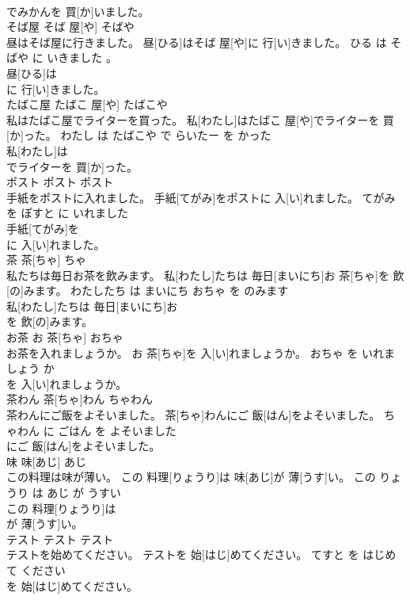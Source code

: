 \documentclass[8pt]{extreport}
\begin{document}
\begin{CJK}{UTF8}{min}
\\	でみかんを 買[か]いました。			
\\	そば屋	そば 屋[や]	そばや	
\\	昼はそば屋に行きました。	昼[ひる]はそば 屋[や]に 行[い]きました。	ひる は そばや に いきました 。	
\\	昼[ひる]は
\\	に 行[い]きました。			
\\	たばこ屋	たばこ 屋[や]	たばこや	
\\	私はたばこ屋でライターを買った。	私[わたし]はたばこ 屋[や]でライターを 買[か]った。	わたし は たばこや で らいたー を かった	
\\	私[わたし]は
\\	でライターを 買[か]った。			
\\	ポスト	ポスト	ポスト	
\\	手紙をポストに入れました。	手紙[てがみ]をポストに 入[い]れました。	てがみ を ぽすと に いれました	
\\	手紙[てがみ]を
\\	に 入[い]れました。			
\\	茶	茶[ちゃ]	ちゃ	
\\	私たちは毎日お茶を飲みます。	私[わたし]たちは 毎日[まいにち]お 茶[ちゃ]を 飲[の]みます。	わたしたち は まいにち おちゃ を のみます	
\\	私[わたし]たちは 毎日[まいにち]お
\\	を 飲[の]みます。			
\\	お茶	お 茶[ちゃ]	おちゃ	
\\	お茶を入れましょうか。	お 茶[ちゃ]を 入[い]れましょうか。	おちゃ を いれましょう か	
\\	を 入[い]れましょうか。			
\\	茶わん	茶[ちゃ]わん	ちゃわん	
\\	茶わんにご飯をよそいました。	茶[ちゃ]わんにご 飯[はん]をよそいました。	ちゃわん に ごはん を よそいました	
\\	にご 飯[はん]をよそいました。			
\\	味	味[あじ]	あじ	
\\	この料理は味が薄い。	この 料理[りょうり]は 味[あじ]が 薄[うす]い。	この りょうり は あじ が うすい	
\\	この 料理[りょうり]は
\\	が 薄[うす]い。			
\\	テスト	テスト	テスト	
\\	テストを始めてください。	テストを 始[はじ]めてください。	てすと を はじめて ください	
\\	を 始[はじ]めてください。			

\end{CJK}
\end{document}
